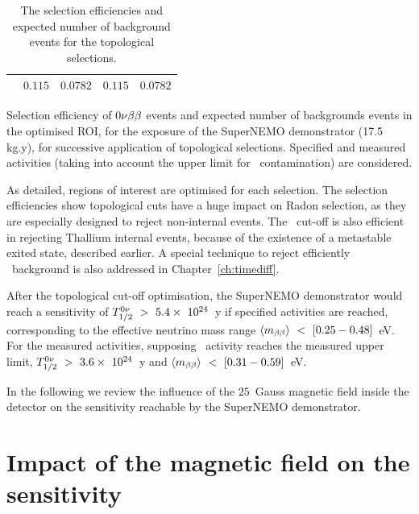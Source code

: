 \begin{table}[h]
\begin{subtable}[h]{1.\textwidth}
\begin{tabular}{|c|c|c|c|c|}
      \Rn  & $0.115$ & $0.0782$ & $0.115$ & $0.0782$ \\
      \hline
    \end{tabular}
    \captionsetup{justification=justified}
    \caption{Selection efficiency of $0\nu\beta\beta$ events and expected number of backgrounds events in the optimised ROI, for the exposure of the SuperNEMO demonstrator (17.5 kg.y), for successive application of topological selections.
      Specified and measured activities (taking into account the upper limit for \Bi\ contamination) are considered.
      \label{tab:Nexp_topo_contamination}}
  \end{subtable}
  \caption{The selection efficiencies and expected number of background events for the topological selections.}
\end{table}
As detailed, regions of interest are optimised for each selection.
The selection efficiencies show topological cuts have a huge impact on Radon selection, as they are especially designed to reject non-internal events.
The \Pint\ cut-off is also efficient in rejecting Thallium internal events, because of the existence of a metastable exited state, described earlier.
A special technique to reject efficiently \Tl\ background is also addressed in Chapter~\ref{ch:timediff}.

After the topological cut-off optimisation, the SuperNEMO demonstrator would reach a sensitivity of $T_{1/2}^{0\nu}~>~5.4\times~10^{24}$~y if specified activities are reached, corresponding to the effective neutrino mass range $\langle m_{\beta\beta}\rangle~<~[0.25-0.48]$~eV.
For the measured activities, supposing \Bi\ activity reaches the measured upper limit, $T_{1/2}^{0\nu}~>~3.6\times~10^{24}$~y and $\langle m_{\beta\beta}\rangle~<~[0.31-0.59]$~eV.

In the following we review the influence of the $25$~Gauss magnetic field inside the detector on the sensitivity reachable by the SuperNEMO demonstrator.

\section{Impact of the magnetic field on the sensitivity}
\label{sec:magnetic_field}

